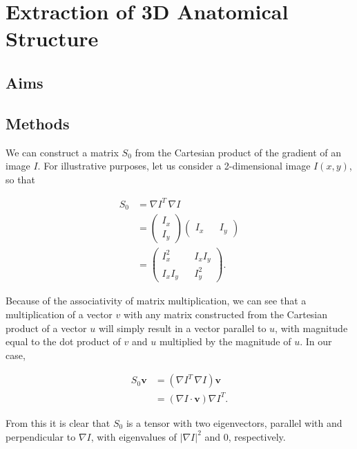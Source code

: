 \chapter{Extraction of 3D Anatomical Structure}
\dblspace

\section{Aims} %
\label{sec:aims}
  

\section{Methods} %
\label{sec:methods}
  We can construct a matrix $S_0$ from the Cartesian product of the gradient of an image $I$. For illustrative purposes, let us consider a 2-dimensional image $I(x,y)$, so that
  
  \begin{align}
    S_0 &= \nabla I^T \, \nabla I \\
        &= \begin{pmatrix}
      I_x \\
      I_y
    \end{pmatrix} \begin{pmatrix}
      I_x && I_y
    \end{pmatrix} \\
        &= \begin{pmatrix}
          I_x^2 && I_xI_y \\
          I_xI_y && I_y^2
        \end{pmatrix}.
  \end{align}
  
  Because of the associativity of matrix multiplication, we can see that a multiplication of a vector $v$ with any matrix constructed from the Cartesian product of a vector $u$ will simply result in a vector parallel to $u$, with magnitude equal to the dot product of $v$ and $u$ multiplied by the magnitude of $u$. In our case,
  
  \begin{align}
    S_0 \mathbf{v} &= (\nabla I^T \, \nabla I) \mathbf{v} \\
                   &= (\nabla I \cdot \mathbf{v}) \nabla I^T.
  \end{align}
  
  From this it is clear that $S_0$ is a tensor with two eigenvectors, parallel with and perpendicular to $\nabla I$, with eigenvalues of $|\nabla I|^2$ and 0, respectively.
  
